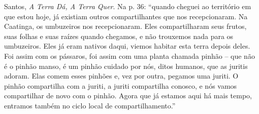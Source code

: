 Santos, \textit{A Terra Dá, A Terra Quer}.
Na p. 36: \enquote{quando cheguei ao território em que estou hoje, já existiam outros compartilhantes que nos recepcionaram. Na Caatinga, os umbuzeiros nos recepcionaram. Eles compartilharam seus frutos, suas folhas e suas raízes quando chegamos, e não trouxemos nada para os umbuzeiros. Eles já eram nativos daqui, viemos habitar esta terra depois deles. Foi assim com os pássaros, foi assim com uma planta chamada pinhão -- que não é o pinhão manso, é um pinhão cuidado por nós, ditos humanos, que as juritis adoram.  Elas comem esses pinhões e, vez por outra, pegamos uma juriti. O pinhão compartilha com a juriti, a juriti compartilha conosco, e nós vamos compartilhar de novo com o pinhão. Agora que já estamos aqui há mais tempo, entramos também no ciclo local de compartilhamento.}